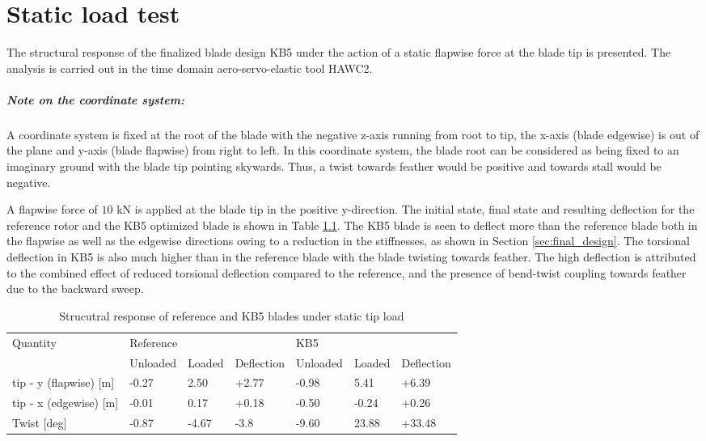 \chapter{Static load test}
\label{ch:load_test}

The structural response of the finalized blade design KB5 under the action of a static flapwise force at the blade tip is presented. The analysis is carried out in the time domain aero-servo-elastic tool HAWC2. 
\paragraph{Note on the coordinate system:}
A coordinate system is fixed at the root of the blade with the negative z-axis running from root to tip, the x-axis (blade edgewise) is out of the plane and y-axis (blade flapwise) from right to left. In this coordinate system, the blade root can be considered as being fixed to an imaginary ground with the blade tip pointing skywards. Thus, a twist towards feather would be positive and towards stall would be negative.

A flapwise force of $10$ kN is applied at the blade tip in the positive y-direction. The initial state, final state and resulting deflection for the reference rotor and the KB5 optimized blade is shown in Table \ref{tab:static_load_test}. The KB5 blade is seen to deflect more than the reference blade both in the flapwise as well as the edgewise directions owing to a reduction in the stiffnesses, as shown in Section \ref{sec:final_design}. The torsional deflection in KB5 is also much higher than in the reference blade with the blade twisting towards feather. The high deflection is attributed to the combined effect of reduced torsional deflection compared to the reference, and the presence of bend-twist coupling towards feather due to the backward sweep.

\begin{table}[pth]
\centering
\caption{Strucutral response of reference and KB5 blades under static tip load}
\label{tab:static_load_test}
\begin{tabular}{|l|l|l|l|l|l|l|}
\hline
\multirow{2}{*}{Quantity}  & \multicolumn{3}{l|}{Reference} & \multicolumn{3}{l|}{KB5}       \\ \cline{2-7} 
                           & Unloaded & Loaded & Deflection & Unloaded & Loaded & Deflection \\ \hline
tip - y (flapwise) {[}m{]} & -0.27    & 2.50   & +2.77      & -0.98    & 5.41   & +6.39      \\
tip - x (edgewise) {[}m{]} & -0.01    & 0.17   & +0.18      & -0.50    & -0.24  & +0.26      \\
Twist {[}deg{]}            & -0.87    & -4.67  & -3.8       & -9.60    & 23.88  & +33.48      \\ \hline
\end{tabular}
\end{table}